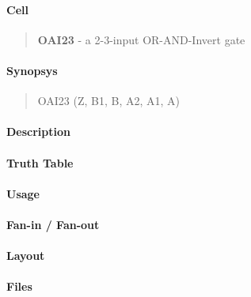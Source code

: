 \label{OAI23}
\paragraph{Cell}
\begin{quote}
    \textbf{OAI23} - a 2-3-input OR-AND-Invert gate
\end{quote}

\paragraph{Synopsys}
\begin{quote}
    OAI23 (Z, B1, B, A2, A1, A)
\end{quote}

\paragraph{Description}

%

\paragraph{Truth Table}
%

\paragraph{Usage}

\paragraph{Fan-in / Fan-out}

\paragraph{Layout}

\paragraph{Files}
